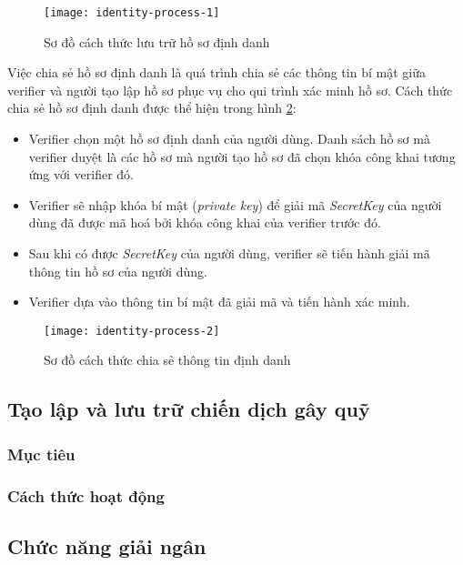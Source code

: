 \documentclass[../main-report.tex]{subfiles}
\begin{document}
\begin{figure}[ht!]
\begin{center}
\label{fig:identity-process-1}
\texttt{[image: identity-process-1]}
\caption{Sơ đồ cách thức lưu trữ hồ sơ định danh}
\end{center}
\end{figure}

Việc chia sẻ hồ sơ định danh là quá trình chia sẻ các thông tin bí mật giữa verifier và người tạo lập hồ sơ phục vụ cho qui trình xác minh hồ sơ. Cách thức chia sẻ hồ sơ định danh được thể hiện trong hình \ref{fig:identity-process-2}:

\begin{itemize}
\item Verifier chọn một hồ sơ định danh của người dùng. Danh sách hồ sơ mà verifier duyệt là các hồ sơ mà người tạo hồ sơ đã chọn khóa công khai tương ứng với verifier đó.
\item Verifier sẽ nhập khóa bí mật (\textit{private key}) để giải mã \textit{SecretKey} của người dùng đã được mã hoá bởi khóa công khai của verifier trước đó.
\item Sau khi có được \textit{SecretKey} của người dùng, verifier sẽ tiến hành giải mã thông tin hồ sơ của người dùng.
\item Verifier dựa vào thông tin bí mật đã giải mã và tiến hành xác minh.
\end{itemize}

\begin{figure}[ht!]
\begin{center}
\label{fig:identity-process-2}
\texttt{[image: identity-process-2]}
\caption{Sơ đồ cách thức chia sẻ thông tin định danh}
\end{center}
\end{figure}

\subsection{Tạo lập và lưu trữ chiến dịch gây quỹ}
\subsubsection{Mục tiêu}

\subsubsection{Cách thức hoạt động}

\subsection{Chức năng giải ngân}
\end{document}
